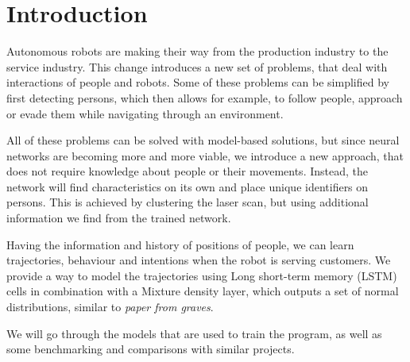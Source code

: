 \section{Introduction}

Autonomous robots are making their way from the production industry to the service industry. This change introduces a new set of problems, that deal with interactions of people and robots. Some of these problems can be simplified by first detecting persons, which then allows for example, to follow people, approach or evade them while navigating through an environment.

All of these problems can be solved with model-based solutions, but since neural networks are becoming more and more viable, we introduce a new approach, that does not require knowledge about people or their movements. Instead, the network will find characteristics on its own and place unique identifiers on persons. This is achieved by clustering the laser scan, but using additional information we find from the trained network.

Having the information and history of positions of people, we can learn trajectories, behaviour and intentions when the robot is serving customers. We provide a way to model the trajectories using Long short-term memory (LSTM) cells in combination with a Mixture density layer, which outputs a set of normal distributions, similar to \textit{paper from graves}.

We will go through the models that are used to train the program, as well as some benchmarking and comparisons with similar projects.